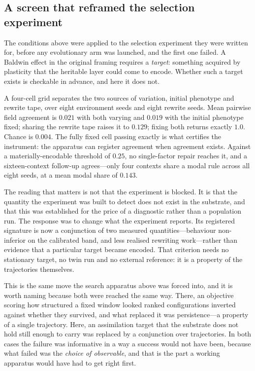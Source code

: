\documentclass[man,12pt,floatsintext,donotrepeattitle]{apa7}
\begin{document}
\subsection*{A screen that reframed the selection experiment}

The conditions above were applied to the selection experiment they were written for,
before any evolutionary arm was launched, and the first one failed. A Baldwin effect in
the original framing requires a \emph{target}: something acquired by plasticity that the
heritable layer could come to encode. Whether such a target exists is checkable in
advance, and here it does not.

A four-cell grid separates the two sources of variation, initial phenotype and rewrite
tape, over eight environment seeds and eight rewrite seeds. Mean pairwise field agreement
is $0.021$ with both varying and $0.019$ with the initial phenotype fixed; sharing the
rewrite tape raises it to $0.129$; fixing both returns exactly $1.0$. Chance is $0.004$.
The fully fixed cell passing exactly is what certifies the instrument: the apparatus can
register agreement when agreement exists. Against a materially-encodable threshold of
$0.25$, no single-factor repair reaches it, and a sixteen-context follow-up agrees---only
four contexts share a modal rule across all eight seeds, at a mean modal share of $0.143$.

The reading that matters is not that the experiment is blocked. It is that the quantity
the experiment was built to detect does not exist in the substrate, and that this was
established for the price of a diagnostic rather than a population run. The response was
to change what the experiment reports. Its registered signature is now a conjunction of
two measured quantities---behaviour non-inferior on the calibrated band, and less realised
rewriting work---rather than evidence that a particular target became encoded. That
criterion needs no stationary target, no twin run and no external reference: it is a
property of the trajectories themselves.

This is the same move the search apparatus above was forced into, and it is worth naming
because both were reached the same way. There, an objective scoring how structured a fixed
window looked ranked configurations inverted against whether they survived, and what
replaced it was persistence---a property of a single trajectory. Here, an assimilation
target that the substrate does not hold still enough to carry was replaced by a
conjunction over trajectories. In both cases the failure was informative in a way a
success would not have been, because what failed was the \emph{choice of observable}, and
that is the part a working apparatus would have had to get right first.


\printbibliography
\end{document}

